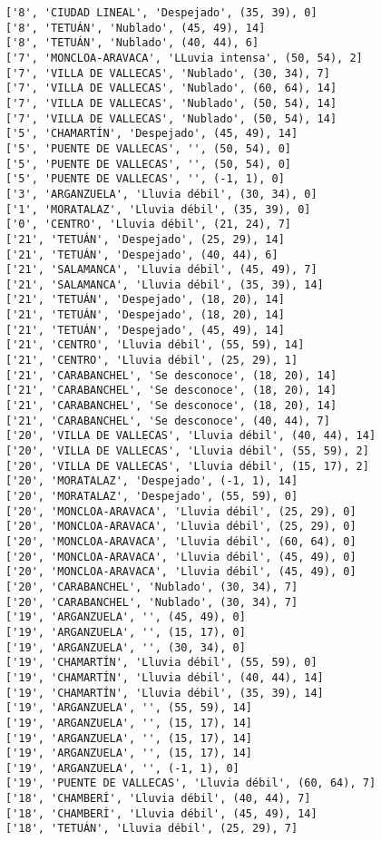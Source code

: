 \documentclass[11pt]{article}
\begin{document}
\begin{Verbatim}[commandchars=\\\{\}]
['8', 'CIUDAD LINEAL', 'Despejado', (35, 39), 0]
['8', 'TETUÁN', 'Nublado', (45, 49), 14]
['8', 'TETUÁN', 'Nublado', (40, 44), 6]
['7', 'MONCLOA-ARAVACA', 'LLuvia intensa', (50, 54), 2]
['7', 'VILLA DE VALLECAS', 'Nublado', (30, 34), 7]
['7', 'VILLA DE VALLECAS', 'Nublado', (60, 64), 14]
['7', 'VILLA DE VALLECAS', 'Nublado', (50, 54), 14]
['7', 'VILLA DE VALLECAS', 'Nublado', (50, 54), 14]
['5', 'CHAMARTÍN', 'Despejado', (45, 49), 14]
['5', 'PUENTE DE VALLECAS', '', (50, 54), 0]
['5', 'PUENTE DE VALLECAS', '', (50, 54), 0]
['5', 'PUENTE DE VALLECAS', '', (-1, 1), 0]
['3', 'ARGANZUELA', 'Lluvia débil', (30, 34), 0]
['1', 'MORATALAZ', 'Lluvia débil', (35, 39), 0]
['0', 'CENTRO', 'Lluvia débil', (21, 24), 7]
['21', 'TETUÁN', 'Despejado', (25, 29), 14]
['21', 'TETUÁN', 'Despejado', (40, 44), 6]
['21', 'SALAMANCA', 'Lluvia débil', (45, 49), 7]
['21', 'SALAMANCA', 'Lluvia débil', (35, 39), 14]
['21', 'TETUÁN', 'Despejado', (18, 20), 14]
['21', 'TETUÁN', 'Despejado', (18, 20), 14]
['21', 'TETUÁN', 'Despejado', (45, 49), 14]
['21', 'CENTRO', 'Lluvia débil', (55, 59), 14]
['21', 'CENTRO', 'Lluvia débil', (25, 29), 1]
['21', 'CARABANCHEL', 'Se desconoce', (18, 20), 14]
['21', 'CARABANCHEL', 'Se desconoce', (18, 20), 14]
['21', 'CARABANCHEL', 'Se desconoce', (18, 20), 14]
['21', 'CARABANCHEL', 'Se desconoce', (40, 44), 7]
['20', 'VILLA DE VALLECAS', 'Lluvia débil', (40, 44), 14]
['20', 'VILLA DE VALLECAS', 'Lluvia débil', (55, 59), 2]
['20', 'VILLA DE VALLECAS', 'Lluvia débil', (15, 17), 2]
['20', 'MORATALAZ', 'Despejado', (-1, 1), 14]
['20', 'MORATALAZ', 'Despejado', (55, 59), 0]
['20', 'MONCLOA-ARAVACA', 'Lluvia débil', (25, 29), 0]
['20', 'MONCLOA-ARAVACA', 'Lluvia débil', (25, 29), 0]
['20', 'MONCLOA-ARAVACA', 'Lluvia débil', (60, 64), 0]
['20', 'MONCLOA-ARAVACA', 'Lluvia débil', (45, 49), 0]
['20', 'MONCLOA-ARAVACA', 'Lluvia débil', (45, 49), 0]
['20', 'CARABANCHEL', 'Nublado', (30, 34), 7]
['20', 'CARABANCHEL', 'Nublado', (30, 34), 7]
['19', 'ARGANZUELA', '', (45, 49), 0]
['19', 'ARGANZUELA', '', (15, 17), 0]
['19', 'ARGANZUELA', '', (30, 34), 0]
['19', 'CHAMARTÍN', 'Lluvia débil', (55, 59), 0]
['19', 'CHAMARTÍN', 'Lluvia débil', (40, 44), 14]
['19', 'CHAMARTÍN', 'Lluvia débil', (35, 39), 14]
['19', 'ARGANZUELA', '', (55, 59), 14]
['19', 'ARGANZUELA', '', (15, 17), 14]
['19', 'ARGANZUELA', '', (15, 17), 14]
['19', 'ARGANZUELA', '', (15, 17), 14]
['19', 'ARGANZUELA', '', (-1, 1), 0]
['19', 'PUENTE DE VALLECAS', 'Lluvia débil', (60, 64), 7]
['18', 'CHAMBERÍ', 'Lluvia débil', (40, 44), 7]
['18', 'CHAMBERÍ', 'Lluvia débil', (45, 49), 14]
['18', 'TETUÁN', 'Lluvia débil', (25, 29), 7]

\end{Verbatim}
\end{document}
